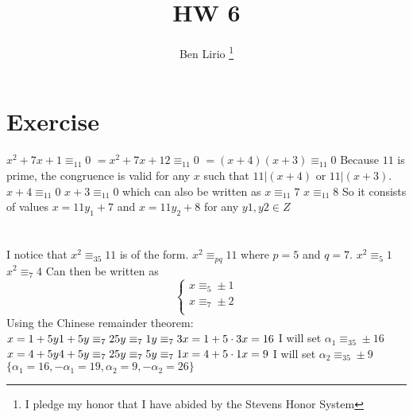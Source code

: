 \documentclass{article}
\title{HW 6}
\author{Ben Lirio \thanks{I pledge my honor that I have abided by the Stevens Honor System}}
\begin{document}
\begin{titlepage}
\maketitle
\end{titlepage}
\section{Exercise}
$x^{2} + 7x + 1 \equiv_{11} 0$
\newline
$ = x^{2} + 7x + 12 \equiv_{11} 0$
\newline
$ = (x+4)(x+3) \equiv_{11} 0$
\newline
Because $11$ is prime, the congruence is valid for any $x$ such that $11|(x+4)$ or $11|(x+3)$.
\newline
$x + 4 \equiv_{11} 0$
\newline
$x + 3 \equiv_{11} 0$
\newline
which can also be written as
\newline
$x \equiv_{11} 7$
\newline
$x \equiv_{11} 8$
\newline
So it consists of values $x = 11y_{1} + 7$ and $x = 11y_{2} + 8$ for any $y1, y2 \in Z$

\section{}
I notice that $x^{2} \equiv_{35} 11$ is of the form. $x^{2} \equiv_{pq} 11$ where $p = 5$ and $q = 7$.
\newline
$x^{2} \equiv_{5} 1$
\newline
$x^{2} \equiv_{7} 4$
\newline
Can then be written as
\newline
\[
	\begin{cases}
	x \equiv_{5} \pm 1 \\
	x \equiv_{7} \pm 2 \\
	\end{cases}
\]
Using the Chinese remainder theorem:
\newline
\(
x = 1 + 5y \\
1 + 5y \equiv_{7} 2 \\
5y \equiv_{7} 1 \\
y \equiv_{7} 3 \\
x = 1 + 5\cdot 3 \\
x = 16
\)
I will set $\alpha_{1} \equiv_{35} \pm 16$
\newline
\(
x = 4 + 5y \\
4 + 5y \equiv_{7} 2 \\
5y \equiv_{7} 5 \\
y \equiv_{7} 1 \\
x = 4 + 5\cdot 1 \\
x = 9
\)
I will set $\alpha_{2} \equiv_{35} \pm 9$
\newline
$\{\alpha_{1} = 16, -\alpha_{1} = 19, \alpha_{2} = 9, -\alpha_{2} = 26\}$
\end{document}
